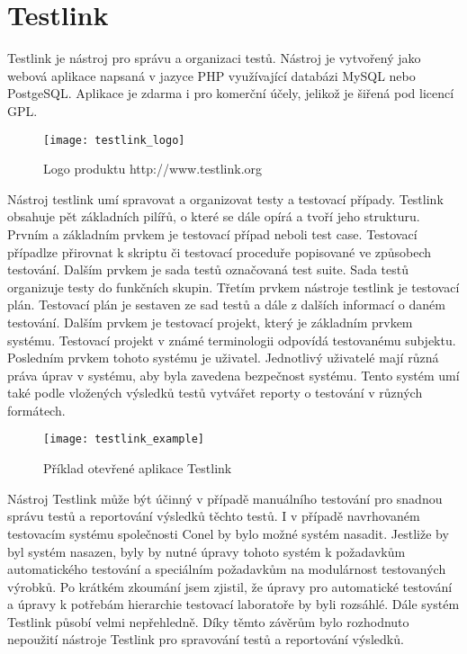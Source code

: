 \section{Testlink}
Testlink je nástroj pro správu a organizaci testů. Nástroj je vytvořený jako webová aplikace napsaná v jazyce PHP využívající databázi MySQL nebo PostgeSQL. Aplikace je zdarma i pro komerční účely, jelikož je šiřená pod licencí GPL.

\begin{figure}[h]
  \centering
  \texttt{[image: testlink\_logo]}
  \caption{Logo produktu http://www.testlink.org}
  \label{fig:testlink_logo}
\end{figure}

Nástroj testlink umí spravovat a organizovat testy a testovací případy. Testlink obsahuje pět základních pilířů, o které se dále opírá a tvoří jeho strukturu. Prvním a základním prvkem je testovací případ neboli test case. Testovací případlze přirovnat k skriptu či testovací proceduře popisované ve způsobech testování. Dalším prvkem je sada testů označovaná test suite. Sada testů organizuje testy do funkčních skupin. Třetím prvkem nástroje testlink je testovací plán. Testovací plán je sestaven ze sad testů a dále z dalších informací o daném testování. Dalším prvkem je testovací projekt, který je základním prvkem systému. Testovací projekt v známé terminologii odpovídá testovanému subjektu. Posledním prvkem tohoto systému je uživatel. Jednotlivý uživatelé mají různá práva úprav v systému, aby byla zavedena bezpečnost systému. Tento systém umí také podle vložených výsledků testů vytvářet reporty o testování v různých formátech.

\begin{figure}[h]
  \centering
  \texttt{[image: testlink\_example]}
  \caption{Příklad otevřené aplikace Testlink}
  \label{fig:testlink_example}
\end{figure}

Nástroj Testlink může být účinný v případě manuálního testování pro snadnou správu testů a reportování výsledků těchto testů. I v případě navrhovaném testovacím systému společnosti Conel by bylo možné systém nasadit. Jestliže by byl systém nasazen, byly by nutné úpravy tohoto systém k požadavkům automatického testování a speciálním požadavkům na modulárnost testovaných výrobků. Po krátkém zkoumání jsem zjistil, že úpravy pro automatické testování a úpravy k potřebám hierarchie  testovací laboratoře by byli rozsáhlé. Dále systém Testlink působí velmi nepřehledně. Díky těmto závěrům bylo rozhodnuto nepoužití nástroje Testlink pro spravování testů a reportování výsledků.

